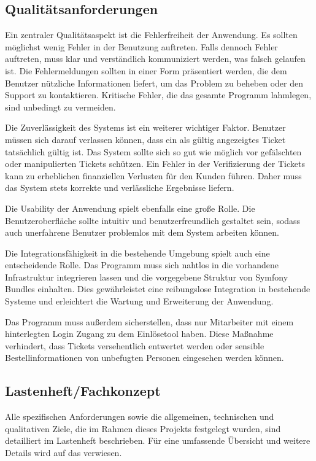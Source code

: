 \subsection{Qualitätsanforderungen}
\label{sec:Qualitaetsanforderungen}

Ein zentraler Qualitätsaspekt ist die Fehlerfreiheit der Anwendung. Es sollten möglichst wenig Fehler in der Benutzung auftreten. Falls dennoch Fehler auftreten, muss klar und verständlich kommuniziert werden, was falsch gelaufen ist. Die Fehlermeldungen sollten in einer Form präsentiert werden, die dem Benutzer nützliche Informationen liefert, um das Problem zu beheben oder den Support zu kontaktieren. Kritische Fehler, die das gesamte Programm lahmlegen, sind unbedingt zu vermeiden.

Die Zuverlässigkeit des Systems ist ein weiterer wichtiger Faktor. Benutzer müssen sich darauf verlassen können, dass ein als gültig angezeigtes Ticket tatsächlich gültig ist. Das System sollte sich so gut wie möglich vor gefälschten oder manipulierten Tickets schützen. Ein Fehler in der Verifizierung der Tickets kann zu erheblichen finanziellen Verlusten für den Kunden führen. Daher muss das System stets korrekte und verlässliche Ergebnisse liefern.

Die Usability der Anwendung spielt ebenfalls eine große Rolle. Die Benutzeroberfläche sollte intuitiv und benutzerfreundlich gestaltet sein, sodass auch unerfahrene Benutzer problemlos mit dem System arbeiten können.

Die Integrationsfähigkeit in die bestehende Umgebung spielt auch eine entscheidende Rolle. Das Programm muss sich nahtlos in die vorhandene Infrastruktur integrieren lassen und die vorgegebene Struktur von Symfony Bundles einhalten. Dies gewährleistet eine reibungslose Integration in bestehende Systeme und erleichtert die Wartung und Erweiterung der Anwendung.

Das Programm muss außerdem sicherstellen, dass nur Mitarbeiter mit einem hinterlegten Login Zugang zu dem Einlösetool haben. Diese Maßnahme verhindert, dass Tickets versehentlich entwertet werden oder sensible Bestellinformationen von unbefugten Personen eingesehen werden können.

\subsection{Lastenheft/Fachkonzept}
\label{sec:Lastenheft}
Alle spezifischen Anforderungen sowie die allgemeinen, technischen und qualitativen Ziele, die im Rahmen dieses Projekts festgelegt wurden, sind detailliert im Lastenheft beschrieben. Für eine umfassende Übersicht und weitere Details wird auf das  verwiesen.

